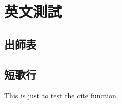 
\chapter{英文測試}

\section{出師表}

\lipsum

\section{短歌行}

\lipsum

This is just to test \cite{Krasnogor2004e} the cite function.